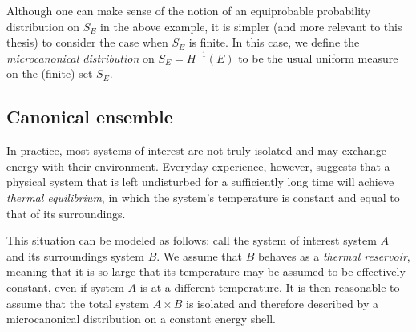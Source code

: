 Although one can make sense of the notion of an equiprobable probability distribution
on $S_E$ in the above example, it is simpler (and more relevant to this thesis) to
consider the case when $S_E$ is finite. In this case, we define the
\emph{microcanonical distribution} on $S_E = H^{-1}(E)$ to be the usual uniform
measure on the (finite) set $S_E$.


\subsection{Canonical ensemble}

In practice, most systems of interest are not truly isolated and may exchange
energy with
their environment. Everyday experience, however, suggests that
a physical system that is left undisturbed for a sufficiently long time will achieve
\emph{thermal equilibrium}, in which the system's
temperature is constant and equal to that of its surroundings.

This situation can be modeled as follows: call the system of interest system $A$ and
its surroundings system $B$. We assume that $B$ behaves as a \emph{thermal reservoir},
meaning that it is so large that its temperature may be assumed to be effectively
constant, even if system $A$ is at a different temperature.
It is then reasonable to assume that the total system $A \times B$
is isolated and therefore described by a microcanonical distribution on a constant energy shell.

